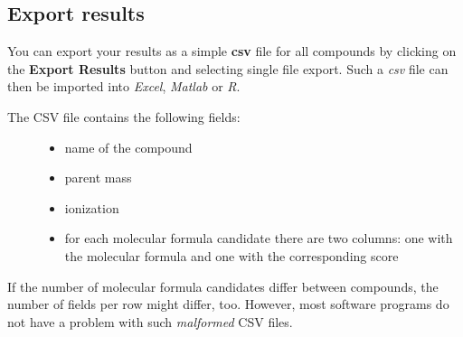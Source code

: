 \documentclass[letterpaper,10pt,openany,oneside]{sphinxmanual}
\begin{document}
\subsection{Export results}
\label{gui:export-results}
You can export your results as a simple \textbf{csv} file for all compounds by clicking on the 
\textbf{Export Results} button and selecting single file export. Such a 
\emph{csv} file can then be imported into \emph{Excel}, \emph{Matlab} or 
\emph{R}.
\begin{description}
\item[{The CSV file contains the following fields:}] \leavevmode\begin{itemize}
\item {} 
name of the compound

\item {} 
parent mass

\item {} 
ionization

\item {} 
for each molecular formula candidate there are two columns: one with the molecular formula and one with the corresponding score

\end{itemize}

\end{description}

If the number of molecular formula candidates differ between compounds, the number of fields per row might differ, too. However, most software programs do not have a problem with such \emph{malformed} CSV files.
\end{document}
